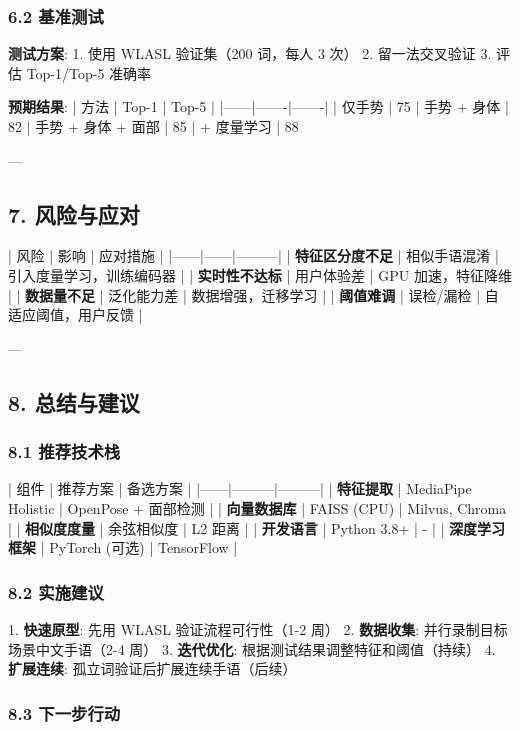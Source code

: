 \documentclass[a4paper,12pt]{article}
\begin{document}
\subsubsection{6.2 基准测试}

\textbf{测试方案}:
1. 使用 WLASL 验证集（200 词，每人 3 次）
2. 留一法交叉验证
3. 评估 Top-1/Top-5 准确率

\textbf{预期结果}:
| 方法 | Top-1 | Top-5 |
|------|-------|-------|
| 仅手势 | 75%
| 手势 + 身体 | 82%
| 手势 + 身体 + 面部 | 85%
| + 度量学习 | 88%

---

\subsection{7. 风险与应对}

| 风险 | 影响 | 应对措施 |
|------|------|---------|
| \textbf{特征区分度不足} | 相似手语混淆 | 引入度量学习，训练编码器 |
| \textbf{实时性不达标} | 用户体验差 | GPU 加速，特征降维 |
| \textbf{数据量不足} | 泛化能力差 | 数据增强，迁移学习 |
| \textbf{阈值难调} | 误检/漏检 | 自适应阈值，用户反馈 |

---

\subsection{8. 总结与建议}

\subsubsection{8.1 推荐技术栈}

| 组件 | 推荐方案 | 备选方案 |
|------|---------|---------|
| \textbf{特征提取} | MediaPipe Holistic | OpenPose + 面部检测 |
| \textbf{向量数据库} | FAISS (CPU) | Milvus, Chroma |
| \textbf{相似度度量} | 余弦相似度 | L2 距离 |
| \textbf{开发语言} | Python 3.8+ | - |
| \textbf{深度学习框架} | PyTorch (可选) | TensorFlow |

\subsubsection{8.2 实施建议}

1. \textbf{快速原型}: 先用 WLASL 验证流程可行性（1-2 周）
2. \textbf{数据收集}: 并行录制目标场景中文手语（2-4 周）
3. \textbf{迭代优化}: 根据测试结果调整特征和阈值（持续）
4. \textbf{扩展连续}: 孤立词验证后扩展连续手语（后续）

\subsubsection{8.3 下一步行动}
\end{document}
